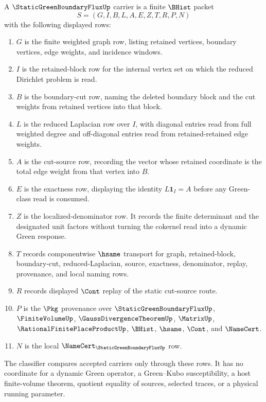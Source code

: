 \begin{definition}
\label{def:static-green-boundary-flux-carrier}
A $\StaticGreenBoundaryFluxUp$ carrier is a finite $\BHist$ packet
$$
S=(G,I,B,L,A,E,Z,T,R,P,N)
$$
with the following displayed rows:
\begin{enumerate}
\item $G$ is the finite weighted graph row, listing retained vertices, boundary vertices, edge weights, and incidence windows.
\item $I$ is the retained-block row for the internal vertex set on which the reduced Dirichlet problem is read.
\item $B$ is the boundary-cut row, naming the deleted boundary block and the cut weights from retained vertices into that block.
\item $L$ is the reduced Laplacian row over $I$, with diagonal entries read from full weighted degree and off-diagonal entries read from retained-retained edge weights.
\item $A$ is the cut-source row, recording the vector whose retained coordinate is the total edge weight from that vertex into $B$.
\item $E$ is the exactness row, displaying the identity $L\mathbf{1}_I=A$ before any Green-class read is consumed.
\item $Z$ is the localized-denominator row. It records the finite determinant and the designated unit factors without turning the cokernel read into a dynamic Green response.
\item $T$ records componentwise $\hsame$ transport for graph, retained-block, boundary-cut, reduced-Laplacian, source, exactness, denominator, replay, provenance, and local naming rows.
\item $R$ records displayed $\Cont$ replay of the static cut-source route.
\item $P$ is the $\Pkg$ provenance over $\StaticGreenBoundaryFluxUp$, $\FiniteVolumeUp$, $\GaussDivergenceTheoremUp$, $\MatrixUp$, $\RationalFinitePlaceProductUp$, $\BHist$, $\hsame$, $\Cont$, and $\NameCert$.
\item $N$ is the local $\NameCert_{\StaticGreenBoundaryFluxUp}$ row.
\end{enumerate}
The classifier compares accepted carriers only through these rows. It has no coordinate for a dynamic Green operator, a Green--Kubo susceptibility, a host finite-volume theorem, quotient equality of sources, selected traces, or a physical running parameter.
\end{definition}

